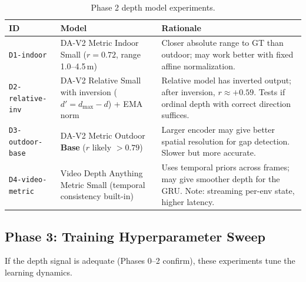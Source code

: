 \documentclass[11pt,a4paper]{article}
\begin{document}
\begin{table}[h]
\centering
\small
\begin{tabular}{p{2.5cm}p{5cm}p{5cm}}
\toprule
\textbf{ID} & \textbf{Model} & \textbf{Rationale} \\
\midrule
\texttt{D1-indoor} &
  DA-V2 Metric Indoor Small ($r = 0.72$, range 1.0--4.5\,m) &
  Closer absolute range to GT than outdoor; may work better with fixed
  affine normalization. \\
\midrule
\texttt{D2-relative-inv} &
  DA-V2 Relative Small with inversion ($d' = d_{\max} - d$) + EMA norm &
  Relative model has inverted output; after inversion, $r \approx +0.59$.
  Tests if ordinal depth with correct direction suffices. \\
\midrule
\texttt{D3-outdoor-base} &
  DA-V2 Metric Outdoor \textbf{Base} ($r$ likely $> 0.79$) &
  Larger encoder may give better spatial resolution for gap detection.
  Slower but more accurate. \\
\midrule
\texttt{D4-video-metric} &
  Video Depth Anything Metric Small (temporal consistency built-in) &
  Uses temporal priors across frames; may give smoother depth for the GRU.
  Note: streaming per-env state, higher latency. \\
\bottomrule
\end{tabular}
\caption{Phase 2 depth model experiments.}
\label{tab:phase2}
\end{table}

\subsection{Phase 3: Training Hyperparameter Sweep}

If the depth signal is adequate (Phases 0--2 confirm), these experiments
tune the learning dynamics.
\end{document}
